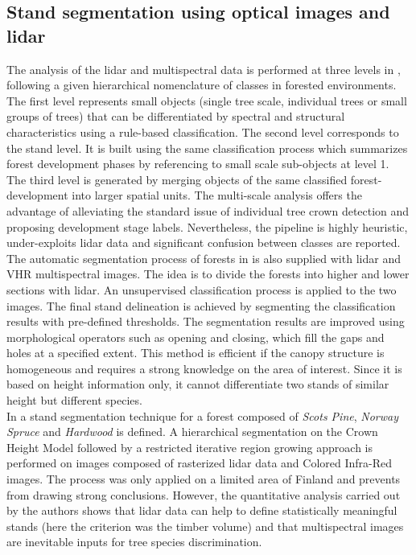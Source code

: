 \subsection{Stand segmentation using optical images and lidar}
The analysis of the lidar and multispectral data is performed at three levels in \citep{tiede2004object}, following a given hierarchical nomenclature of classes in forested environments. The first level represents small objects (single tree scale, individual trees or small groups of trees) that can be differentiated by spectral and structural characteristics using a rule-based classification. The second level corresponds to the stand level. It is built using the same classification process which summarizes forest development phases by referencing to small scale sub-objects at level 1. The third level is generated by merging objects of the same classified forest-development into larger spatial units. The multi-scale analysis offers the advantage of alleviating the standard issue of individual tree crown detection and proposing development stage labels. Nevertheless, the pipeline is highly heuristic, under-exploits lidar data and significant confusion between classes are reported.\\
The automatic segmentation process of forests in \citep{diedershagen2004automatic} is also supplied with lidar and VHR multispectral images. The idea is to divide the forests into higher and lower sections with lidar. An unsupervised classification process is applied to the two images. The final stand delineation is achieved by segmenting the classification results with pre-defined thresholds. The segmentation results are improved using morphological operators such as opening and closing, which fill the gaps and holes at a specified extent. This method is efficient if the canopy structure is homogeneous and requires a strong knowledge on the area of interest. Since it is based on height information only, it cannot differentiate two stands of similar height but different species.\\
In \citep{leppanen2008automatic} a stand segmentation technique for a forest composed of \textit{Scots Pine}, \textit{Norway Spruce} and \textit{Hardwood} is defined. A hierarchical segmentation on the Crown Height Model followed by a restricted iterative region growing approach is performed on images composed of rasterized lidar data and Colored Infra-Red images. The process was only applied on a limited area of Finland and prevents from drawing strong conclusions. However, the quantitative analysis carried out by the authors shows that lidar data can help to define statistically meaningful stands (here the criterion was the timber volume) and that multispectral images are inevitable inputs for tree species discrimination. \\

